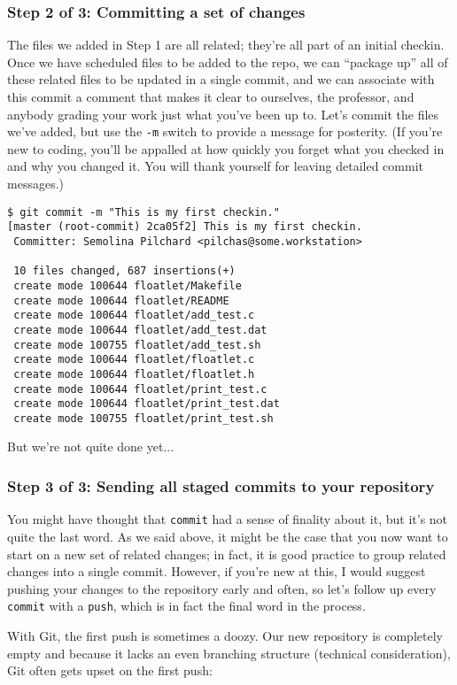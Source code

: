 \documentclass[12pt]{article}
\begin{document}
\subsubsection{Step 2 of 3: Committing a set of changes}
The files we added in Step 1 are all related; they're all part of an initial checkin.   Once we have scheduled files to be added to the repo, we can ``package up'' all of these related files to be updated in a single commit, and we can associate with this commit a comment that makes it clear to ourselves, the professor, and anybody grading your work just what you've been up to.  Let's commit the files we've added, but use the \verb|-m| switch to provide a message for posterity.  (If you're new to coding, you'll be appalled at how quickly you forget what you checked in and why you changed it.  You will thank yourself for leaving detailed commit messages.)
\begin{verbatim}
$ git commit -m "This is my first checkin."
[master (root-commit) 2ca05f2] This is my first checkin.
 Committer: Semolina Pilchard <pilchas@some.workstation>

 10 files changed, 687 insertions(+)
 create mode 100644 floatlet/Makefile
 create mode 100644 floatlet/README
 create mode 100644 floatlet/add_test.c
 create mode 100644 floatlet/add_test.dat
 create mode 100755 floatlet/add_test.sh
 create mode 100644 floatlet/floatlet.c
 create mode 100644 floatlet/floatlet.h
 create mode 100644 floatlet/print_test.c
 create mode 100644 floatlet/print_test.dat
 create mode 100755 floatlet/print_test.sh
\end{verbatim}
But we're not quite done yet...

\subsubsection{Step 3 of 3: Sending all staged commits to your repository}
You might have thought that \verb|commit| had a sense of finality about it, but it's not quite the last word.  As we said above, it might be the case that you now want to start on a new set of related changes; in fact, it is good practice to group related changes into a single commit.  However, if you're new at this, I would suggest pushing your changes to the repository early and often, so let's follow up every \verb|commit| with a \verb|push|, which is in fact the final word in the process.

With Git, the first push is sometimes a doozy.  Our new repository is completely empty and because it lacks an even  branching structure (technical consideration), Git often gets upset on the first push:
\end{document}
